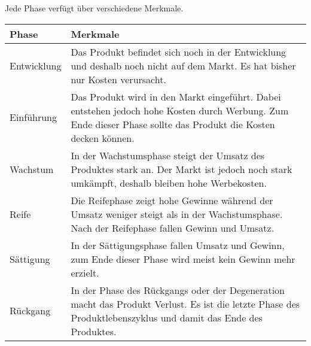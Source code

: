 \begin{center}
\end{center}
\pagebreak

\begin{flushleft}
    Jede Phase verfügt über verschiedene Merkmale.
\end{flushleft}
\begin{center}
\begin{tabular}{|l|p{8cm}|}
    \hline
    \textbf{Phase} & \textbf{Merkmale} \\
    \hline
    Entwicklung & Das Produkt befindet sich noch in der Entwicklung und deshalb noch nicht auf dem Markt. Es hat bisher nur Kosten verursacht. \\
    \hline
    Einführung & Das Produkt wird in den Markt eingeführt. Dabei entstehen jedoch hohe Kosten durch Werbung. Zum Ende dieser Phase sollte das Produkt die Kosten decken können. \\
    \hline
    Wachstum & In der Wachstumsphase steigt der Umsatz des Produktes stark an. Der Markt ist jedoch noch stark umkämpft, deshalb bleiben hohe Werbekosten. \\
    \hline
    Reife & Die Reifephase zeigt hohe Gewinne während der Umsatz weniger steigt als in der Wachstumsphase. Nach der Reifephase fallen Gewinn und Umsatz. \\
    \hline
    Sättigung & In der Sättigungsphase fallen Umsatz und Gewinn, zum Ende dieser Phase wird meist kein Gewinn mehr erzielt. \\
    \hline
    Rückgang & In der Phase des Rückgangs oder der Degeneration macht das Produkt Verlust. Es ist die letzte Phase des Produktlebenszyklus und damit das Ende des Produktes. \\
    \hline
\end{tabular}
\end{center}

